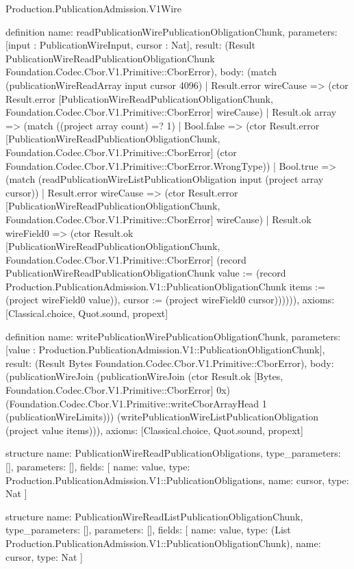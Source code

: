 \begin{lexlean}{Production.PublicationAdmission.V1Wire}
\begin{semanticmodule}
definition{
  name: readPublicationWirePublicationObligationChunk,
  parameters: [input : PublicationWireInput, cursor : Nat],
  result: (Result PublicationWireReadPublicationObligationChunk Foundation.Codec.Cbor.V1.Primitive::CborError),
  body: (match (publicationWireReadArray input cursor 4096)
    | Result.error wireCause => (ctor Result.error [PublicationWireReadPublicationObligationChunk, Foundation.Codec.Cbor.V1.Primitive::CborError] wireCause)
    | Result.ok array => (match ((project array count) =? 1)
      | Bool.false => (ctor Result.error [PublicationWireReadPublicationObligationChunk, Foundation.Codec.Cbor.V1.Primitive::CborError] (ctor Foundation.Codec.Cbor.V1.Primitive::CborError.WrongType))
      | Bool.true => (match (readPublicationWireListPublicationObligation input (project array cursor))
        | Result.error wireCause => (ctor Result.error [PublicationWireReadPublicationObligationChunk, Foundation.Codec.Cbor.V1.Primitive::CborError] wireCause)
        | Result.ok wireField0 => (ctor Result.ok [PublicationWireReadPublicationObligationChunk, Foundation.Codec.Cbor.V1.Primitive::CborError] (record PublicationWireReadPublicationObligationChunk {value := (record Production.PublicationAdmission.V1::PublicationObligationChunk {items := (project wireField0 value)}), cursor := (project wireField0 cursor)}))))),
  axioms: [Classical.choice, Quot.sound, propext]
}

definition{
  name: writePublicationWirePublicationObligationChunk,
  parameters: [value : Production.PublicationAdmission.V1::PublicationObligationChunk],
  result: (Result Bytes Foundation.Codec.Cbor.V1.Primitive::CborError),
  body: (publicationWireJoin (publicationWireJoin (ctor Result.ok [Bytes, Foundation.Codec.Cbor.V1.Primitive::CborError] 0x) (Foundation.Codec.Cbor.V1.Primitive::writeCborArrayHead 1 (publicationWireLimits))) (writePublicationWireListPublicationObligation (project value items))),
  axioms: [Classical.choice, Quot.sound, propext]
}

structure{
  name: PublicationWireReadPublicationObligations,
  type_parameters: [],
  parameters: [],
  fields: [
    {name: value, type: Production.PublicationAdmission.V1::PublicationObligations},
    {name: cursor, type: Nat}
  ]
}

structure{
  name: PublicationWireReadListPublicationObligationChunk,
  type_parameters: [],
  parameters: [],
  fields: [
    {name: value, type: (List Production.PublicationAdmission.V1::PublicationObligationChunk)},
    {name: cursor, type: Nat}
  ]
}


\end{semanticmodule}
\end{lexlean}
